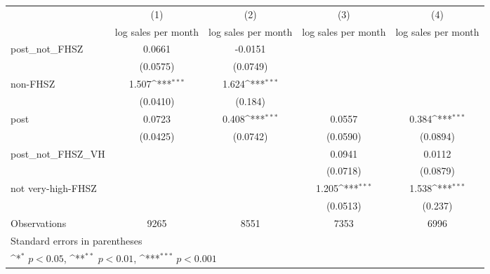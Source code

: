{
\def\sym#1{\ifmmode^{#1}\else\(^{#1}\)\fi}
\begin{tabular}{l*{4}{c}}
\hline\hline
                    &\multicolumn{1}{c}{(1)}&\multicolumn{1}{c}{(2)}&\multicolumn{1}{c}{(3)}&\multicolumn{1}{c}{(4)}\\
                    &\multicolumn{1}{c}{log sales per month}&\multicolumn{1}{c}{log sales per month}&\multicolumn{1}{c}{log sales per month}&\multicolumn{1}{c}{log sales per month}\\
\hline
post\_not\_FHSZ       &      0.0661         &     -0.0151         &                     &                     \\
                    &    (0.0575)         &    (0.0749)         &                     &                     \\
[1em]
non-FHSZ            &       1.507\sym{***}&       1.624\sym{***}&                     &                     \\
                    &    (0.0410)         &     (0.184)         &                     &                     \\
[1em]
post                &      0.0723         &       0.408\sym{***}&      0.0557         &       0.384\sym{***}\\
                    &    (0.0425)         &    (0.0742)         &    (0.0590)         &    (0.0894)         \\
[1em]
post\_not\_FHSZ\_VH    &                     &                     &      0.0941         &      0.0112         \\
                    &                     &                     &    (0.0718)         &    (0.0879)         \\
[1em]
not very-high-FHSZ  &                     &                     &       1.205\sym{***}&       1.538\sym{***}\\
                    &                     &                     &    (0.0513)         &     (0.237)         \\
\hline
Observations        &        9265         &        8551         &        7353         &        6996         \\
\hline\hline
\multicolumn{5}{l}{\footnotesize Standard errors in parentheses}\\
\multicolumn{5}{l}{\footnotesize \sym{*} \(p<0.05\), \sym{**} \(p<0.01\), \sym{***} \(p<0.001\)}\\
\end{tabular}
}
